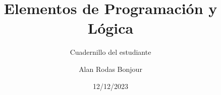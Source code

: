 \documentclass[11pt,fleqn]{book} %
\begin{document}

\title{Elementos de Programación y Lógica}
\subtitle{Cuadernillo del estudiante}
\author{Alan Rodas Bonjour}
\date{12/12/2023}


\maketitle





\setlength{\parskip}{0.5em}




\end{document}
